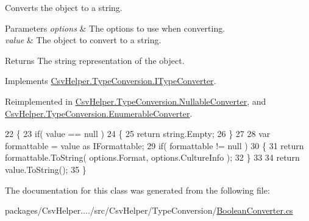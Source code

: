Converts the object to a string. 


\begin{DoxyParams}{Parameters}
{\em options} & The options to use when converting.\\
\hline
{\em value} & The object to convert to a string.\\
\hline
\end{DoxyParams}
\begin{DoxyReturn}{Returns}
The string representation of the object.
\end{DoxyReturn}


Implements \hyperlink{a00099_a90c465c63dbcf913f38aa878f35e77c7}{Csv\-Helper.\-Type\-Conversion.\-I\-Type\-Converter}.



Reimplemented in \hyperlink{a00116_a7205cdb61d2d119582958232b3e63109}{Csv\-Helper.\-Type\-Conversion.\-Nullable\-Converter}, and \hyperlink{a00078_a7e07e9532857d748654d37db590a0e11}{Csv\-Helper.\-Type\-Conversion.\-Enumerable\-Converter}.


\begin{DoxyCode}
22         \{
23             \textcolor{keywordflow}{if}( value == null )
24             \{
25                 \textcolor{keywordflow}{return} string.Empty;
26             \}
27 
28             var formattable = value as IFormattable;
29             \textcolor{keywordflow}{if}( formattable != null )
30             \{
31                 \textcolor{keywordflow}{return} formattable.ToString( options.Format, options.CultureInfo );
32             \}
33 
34             \textcolor{keywordflow}{return} value.ToString();
35         \}
\end{DoxyCode}


The documentation for this class was generated from the following file\-:\begin{DoxyCompactItemize}
\item 
packages/\-Csv\-Helper..../src/\-Csv\-Helper/\-Type\-Conversion/\hyperlink{a00224}{Boolean\-Converter.\-cs}\end{DoxyCompactItemize}
